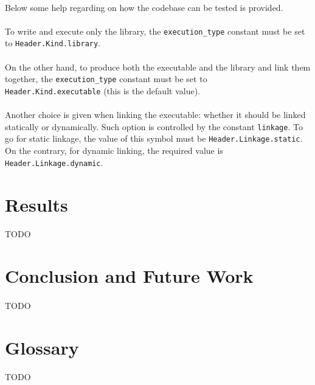 \documentclass[12pt]{article}
\begin{document}
	\paragraph{}Below some help regarding on how the codebase can be tested is provided.
	\paragraph{}To write and execute only the library, the \verb|execution_type| constant must be set to \verb|Header.Kind.library|.
	\paragraph{}On the other hand, to produce both the executable and the library and link them together, the \verb|execution_type| constant must be set to\\ \verb|Header.Kind.executable| (this is the default value).
	\paragraph{}Another choice is given when linking the executable: whether it should be linked statically or dynamically. Such option is controlled by the constant \verb|linkage|. To go for static linkage, the value of this symbol must be \verb|Header.Linkage.static|. On the contrary, for dynamic linking, the required value is \verb|Header.Linkage.dynamic|.
	\newpage
	\section{Results}
	\paragraph{}TODO
	
	\newpage
	\section{Conclusion and Future Work}
	\paragraph{}TODO
	
	\newpage
	\section{Glossary}
	\paragraph{}TODO
\end{document}
